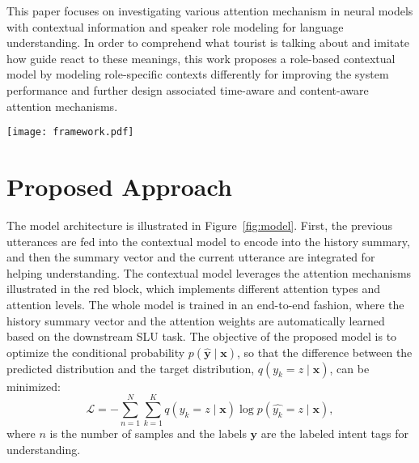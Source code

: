 \documentclass{article}
\begin{document}
This paper focuses on investigating various attention mechanism in neural models with contextual information and speaker role modeling for language understanding. 
In order to comprehend what tourist is talking about and imitate how guide react to these meanings, this work proposes a role-based contextual model by modeling role-specific contexts differently for improving the system performance and further design associated time-aware and content-aware attention mechanisms.

\begin{figure*}[t]
\centering
\texttt{[image: framework.pdf]}
\caption{Illustration of the proposed attentional contextual model.}
\label{fig:model}
\end{figure*}

\section{Proposed Approach}
\label{sec:model}

The model architecture is illustrated in Figure~\ref{fig:model}.
First, the previous utterances are fed into the contextual model to encode into the history summary, and then the summary vector and the current utterance are integrated for helping understanding.
The contextual model leverages the attention mechanisms illustrated in the red block, which implements different attention types and attention levels. 
The whole model is trained in an end-to-end fashion, where the history summary vector and the attention weights are automatically learned based on the downstream SLU task.
The objective of the proposed model is to optimize the conditional probability $p(\mathbf{\hat{y}}\mid \mathbf{x})$, so that the difference between the predicted distribution and the target distribution, $q(y_k=z\mid \mathbf{x})$, can be minimized:
\begin{equation}
\mathcal{L}=-\sum_{n=1}^{N}\sum_{k=1}^{K}q(y_k=z\mid \mathbf{x}) \log p(\hat{y_k}=z\mid \mathbf{x}),
\end{equation}
where $n$ is the number of samples and the labels $\textbf{y}$ are the labeled intent tags for understanding.
\end{document}
